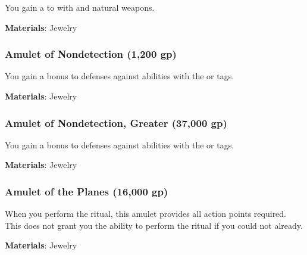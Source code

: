 You gain a   to  with  and natural weapons.



\vspace{0.25em}
\textbf{Materials}: Jewelry


\lowercase{\hypertarget{item:Amulet of Nondetection}{}}\label{item:Amulet of Nondetection}
\hypertarget{item:Amulet of Nondetection}{\subsubsection{Amulet of Nondetection\hfill{} (1,200 gp)}}

You gain a  bonus to defenses against abilities with the  or  tags.



\vspace{0.25em}
\textbf{Materials}: Jewelry


\lowercase{\hypertarget{item:Amulet of Nondetection, Greater}{}}\label{item:Amulet of Nondetection, Greater}
\hypertarget{item:Amulet of Nondetection, Greater}{\subsubsection{Amulet of Nondetection, Greater\hfill{} (37,000 gp)}}

You gain a  bonus to defenses against abilities with the  or  tags.



\vspace{0.25em}
\textbf{Materials}: Jewelry


\lowercase{\hypertarget{item:Amulet of the Planes}{}}\label{item:Amulet of the Planes}
\hypertarget{item:Amulet of the Planes}{\subsubsection{Amulet of the Planes\hfill{} (16,000 gp)}}

When you perform the  ritual, this amulet provides all action points required.
This does not grant you the ability to perform the  ritual if you could not already.



\vspace{0.25em}
\textbf{Materials}: Jewelry


